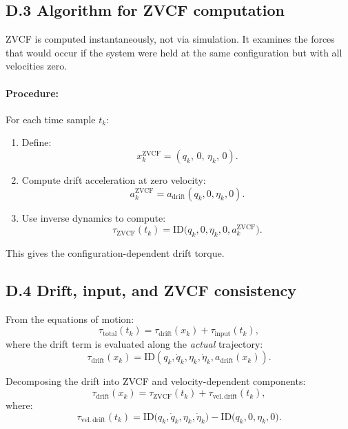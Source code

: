 \documentclass[12pt]{article}
\begin{document}
\subsection{D.3 \quad Algorithm for ZVCF computation}

ZVCF is computed instantaneously, not via simulation. It examines the forces that would occur if the system were held at the same configuration but with all velocities zero.

\paragraph{Procedure:}
For each time sample \(t_k\):
\begin{enumerate}
  \item Define:
  \[
    x^{\mathrm{ZVCF}}_k = (q_k,\, 0,\, \eta_k,\, 0).
  \]
  \item Compute drift acceleration at zero velocity:
  \[
    a^{\mathrm{ZVCF}}_k
    =
    a_{\mathrm{drift}}(q_k,0,\eta_k,0).
  \]
  \item Use inverse dynamics to compute:
  \[
    \tau_{\mathrm{ZVCF}}(t_k)
    =
    \mathrm{ID}\big(q_k,0,\eta_k,0,a^{\mathrm{ZVCF}}_k\big).
  \]
\end{enumerate}

This gives the configuration-dependent drift torque.

\subsection{D.4 \quad Drift, input, and ZVCF consistency}

From the equations of motion:
\[
  \tau_{\mathrm{total}}(t_k)
  =
  \tau_{\mathrm{drift}}(x_k)
  +
  \tau_{\mathrm{input}}(t_k),
\]
where the drift term is evaluated along the \emph{actual} trajectory:
\[
  \tau_{\mathrm{drift}}(x_k)
  =
  \mathrm{ID}\!\left(q_k,\dot{q}_k,\eta_k,\dot{\eta}_k,a_{\mathrm{drift}}(x_k)\right).
\]

Decomposing the drift into ZVCF and velocity-dependent components:
\[
  \tau_{\mathrm{drift}}(x_k)
  =
  \tau_{\mathrm{ZVCF}}(t_k)
  +
  \tau_{\mathrm{vel.\,drift}}(t_k),
\]
where:
\[
  \tau_{\mathrm{vel.\,drift}}(t_k)
  =
  \mathrm{ID}\big(q_k,\dot{q}_k,\eta_k,\dot{\eta}_k\big)
  - \mathrm{ID}\big(q_k,0,\eta_k,0\big).
\]
\end{document}
